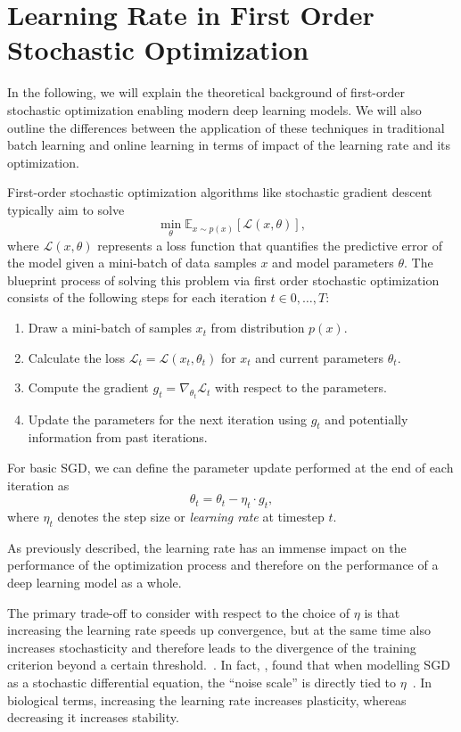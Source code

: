 \documentclass[letterpaper]{article} %
\begin{document}
\section{Learning Rate in First Order Stochastic Optimization}

In the following, we will explain the theoretical background of first-order stochastic optimization enabling modern deep learning models.
We will also outline the differences between the application of these techniques in traditional batch learning and online learning in terms of impact of the learning rate and its optimization.

First-order stochastic optimization algorithms like stochastic gradient descent typically aim to solve
\begin{equation}
	\min_{\theta} \mathbb{E}_{x \sim p(x)} [\mathcal{L}(x, \theta)],
\end{equation}
where $\mathcal{L}(x, \theta)$ represents a loss function that quantifies the predictive error of the model given a mini-batch of data samples $x$ and model parameters $\theta$.
The blueprint process of solving this problem via first order stochastic optimization consists of the following steps for each iteration $t \in 0, \ldots, T$:
\begin{enumerate}
	\item Draw a mini-batch of samples $x_t$ from distribution $p(x)$.
	\item Calculate the loss $\mathcal{L}_t = \mathcal{L}(x_t, \theta_t)$ for $x_t$ and current parameters $\theta_t$.
	\item Compute the gradient $g_t = \nabla_{\theta_t} \mathcal{L}_t$ with respect to the parameters.
	\item Update the parameters for the next iteration using $g_t$ and potentially information from past iterations.
\end{enumerate}

For basic SGD, we can define the parameter update performed at the end of each iteration as
\begin{equation}
	\theta_{t}  = \theta_{t} - \eta_t \cdot g_t,
\end{equation}
where $\eta_t$ denotes the step size or \textit{learning rate} at timestep $t$.

As previously described, the learning rate has an immense impact on the performance of the optimization process and therefore on the performance of a deep learning model as a whole.

The primary trade-off to consider with respect to the choice of $\eta$ is that increasing the learning rate speeds up convergence, but at the same time also increases stochasticity and therefore leads to the divergence of the training criterion beyond a certain threshold.~\cite{bengioPracticalRecommendationsGradientbased2012}.
In fact, \citet{smithBayesianPerspectiveGeneralization2018}, found that when modelling SGD as a stochastic differential equation, the “noise scale” is directly tied to $\eta$~\cite{smithBayesianPerspectiveGeneralization2018}.
In biological terms, increasing the learning rate increases plasticity, whereas decreasing it increases stability.
\end{document}
